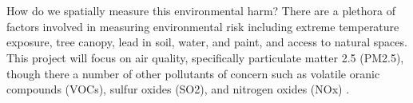 \documentclass[article,12pt]{article}
\numberwithin{equation}{section}
\begin{document}
\begin{adjustwidth}{-.88in}{-.88in}
		\begin{multicols}{2}
			\begin{center}
		\\
		
%
		\\
	\end{center}
	\vspace{.2in}
	How do we spatially measure this environmental harm? There are a plethora of factors involved in measuring environmental risk including extreme temperature exposure, tree canopy, lead in soil, water, and paint, and access to natural spaces. This project will focus on air quality, specifically particulate matter 2.5 (PM2.5), though there a number of other pollutants of concern such as volatile oranic compounds (VOCs), sulfur oxides (SO2), and nitrogen oxides (NOx) \cite{healthprofess}.
	\end{multicols}
\end{adjustwidth}
\vspace{.2in}

\end{document}
